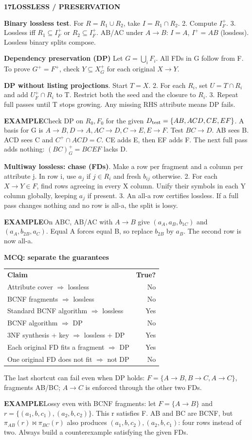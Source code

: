 \documentclass[a4paper]{article}
\newcommand{\bodyfontsize}{5.55}
\newcommand{\bodyleading}{5.3}
\newcommand{\bodylineskiplimit}{-2pt}
\newcommand{\bodystyle}{%
  \fontsize{\bodyfontsize}{\bodyleading}\selectfont\setlength{\lineskiplimit}{\bodylineskiplimit}\RaggedRight
  \setlength{\abovedisplayskip}{.5pt}\setlength{\belowdisplayskip}{.5pt}%
  \setlength{\abovedisplayshortskip}{.3pt}\setlength{\belowdisplayshortskip}{.3pt}}
\newcommand{\topic}[2]{\par\addvspace{.45pt}\nointerlineskip%
  \begingroup\setlength{\fboxsep}{0.35pt}%
  \noindent\colorbox{structure}{\parbox{\dimexpr\linewidth-2\fboxsep\relax}{%
    \color{white}\fontsize{6.45}{6.8}\selectfont\bfseries #1\enspace #2}}%
  \endgroup\par\nobreak\vspace{.55pt}\nointerlineskip\nobreak}
\newenvironment{topicblock}
  {\par\bodystyle}
  {\par}
\newcommand{\key}[1]{\par\textcolor{structure}{\textbf{#1}}\enspace}
\newcommand{\note}[4]{\par\nointerlineskip\vspace{.25pt}\begingroup\setlength{\fboxsep}{0.1pt}%
  \noindent\colorbox{#1}{\parbox{\dimexpr\linewidth-2\fboxsep\relax}{%
    \RaggedRight\textcolor{#2}{\textbf{#3}}\enspace #4}}%
  \endgroup\par\nointerlineskip\vspace{.25pt}}
\newcommand{\ex}[1]{\note{examplebg}{example}{EXAMPLE}{#1}}
\newlength{\sheetwidth}
\newenvironment{sheetcolumns}[1]
  {\noindent\begin{minipage}[t]{#1\sheetwidth}\vspace{0pt}\bodystyle\ignorespaces}
  {\end{minipage}\par}
\begin{document}
\begin{sheetcolumns}{.267}
\begin{topicblock}
\topic{17}{LOSSLESS / PRESERVATION}
\key{Binary lossless test}
1. For $R=R_1\cup R_2$, take $I=R_1\cap R_2$. 2. Compute $I_F^+$.
3. Lossless iff $R_1\subseteq I_F^+$ or $R_2\subseteq I_F^+$. AB/AC under $A\to B$: $I=A$, $I^+=AB$ (lossless). Lossless binary splits compose.
\key{Dependency preservation (DP)}
Let $G=\bigcup_i F_i$. All FDs in G follow from F. To prove $G^+=F^+$, check $Y\subseteq X_G^+$ for each original $X\to Y$.
\key{DP without listing projections}
1. Start $T=X$. 2. For each $R_i$, set $U=T\cap R_i$ and add $U_F^+\cap R_i$ to T. Restrict both the seed and the closure to $R_i$.
3. Repeat full passes until T stops growing. Any missing RHS attribute means DP fails.
\ex{Check DP on $R_0,F_0$ for the given $D_{\rm test}=\{AB,ACD,CE,EF\}$. A basis for G is $A\to B,D\to A,AC\to D,C\to E,E\to F$.
Test $BC\to D$. AB sees B. ACD sees C and $C^+\cap ACD=C$. CE adds E, then EF adds F. The next full pass adds nothing: $(BC)^+_G=BCEF$ lacks D.}
\key{Multiway lossless: chase (FDs)}
1. Make a row per fragment and a column per attribute j. In row i, use $a_j$ if $j\in R_i$ and fresh $b_{ij}$ otherwise.
2. For each $X\to Y\in F$, find rows agreeing in every X column. Unify their symbols in each Y column globally, keeping $a_j$ if present.
3. An all-a row certifies lossless. If a full pass changes nothing and no row is all-a, the split is lossy.
\ex{On ABC, AB/AC with $A\to B$ give $(a_A,a_B,b_{1C})$ and $(a_A,b_{2B},a_C)$. Equal A forces equal B, so replace $b_{2B}$ by $a_B$. The second row is now all-a.}
\key{MCQ: separate the guarantees}
\par\begin{tabular}{@{}lr@{}}
\textbf{Claim} & \textbf{True?}\\
Attribute cover $\Rightarrow$ lossless & No\\
BCNF fragments $\Rightarrow$ lossless & No\\
Standard BCNF algorithm $\Rightarrow$ lossless & Yes\\
BCNF algorithm $\Rightarrow$ DP & No\\
3NF synthesis + key $\Rightarrow$ lossless + DP & Yes\\
Each original FD fits a fragment $\Rightarrow$ DP & Yes\\
One original FD does not fit $\Rightarrow$ not DP & No
\end{tabular}\par
The last shortcut can fail even when DP holds: $F=\{A\to B,B\to C,A\to C\}$, fragments AB/BC; $A\to C$ is enforced through the other two FDs.
\ex{Lossy even with BCNF fragments: let $F=\{A\to B\}$ and $r=\{(a_1,b,c_1),(a_2,b,c_2)\}$. This r satisfies F. AB and BC are BCNF, but $\pi_{AB}(r)\bowtie\pi_{BC}(r)$ also produces $(a_1,b,c_2),(a_2,b,c_1)$: four rows instead of two. Always build a counterexample satisfying the given FDs.}
\end{topicblock}


\end{sheetcolumns}
\end{document}
